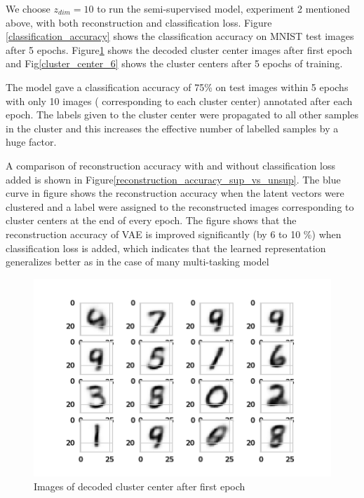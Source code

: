 \documentclass{uai2021} %
\begin{document}
We choose $z_{dim}=10$ to run the  semi-supervised model, experiment 2 mentioned above,  with both reconstruction and classification loss.
Figure \ref{classification_accuracy} shows the classification accuracy on MNIST test images after 5 epochs.
Figure\ref{cluster_center_1} shows the decoded cluster center images after first epoch and Fig\ref{cluster_center_6} shows the cluster centers after 5 epochs of training.


The model gave a classification accuracy of 75\% on test images within 5 epochs with only 10 images ( corresponding to each  cluster center) annotated after each epoch.
The labels given to the cluster center were propagated to all other samples in the cluster and this increases the effective number of labelled samples by a huge factor.

A comparison of reconstruction accuracy with and without classification loss added is shown in Figure\ref{reconstruction_accuracy_sup_vs_unsup}.
The blue curve in figure shows the reconstruction accuracy when the latent vectors were clustered and a label were assigned to the reconstructed images corresponding to  cluster centers at the end of every epoch.
The figure shows that the reconstruction accuracy of VAE is improved significantly  (by 6 to 10 \%) when classification loss is added, which indicates that the learned representation generalizes better as in the case of many multi-tasking model


\begin{figure}[]
\centering
\includegraphics[width=\linewidth]{cluster_centers_epoch_1.0}
\caption{Images of decoded cluster center after first epoch}
\label{cluster_center_1}
\end{figure}
\end{document}
